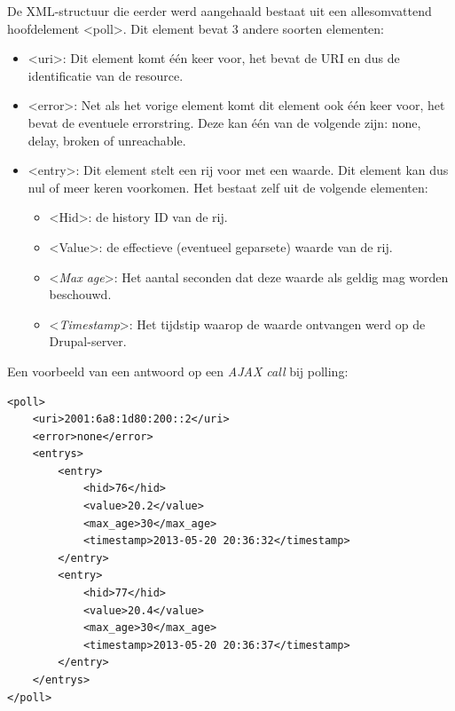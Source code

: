De XML-structuur die eerder werd aangehaald bestaat uit een allesomvattend hoofdelement \textless poll\textgreater. Dit element bevat 3 andere soorten elementen:
\begin{itemize}
\item \textless uri\textgreater: Dit element komt \'{e}\'{e}n keer voor, het bevat de URI en dus de identificatie van de resource.
\item \textless error\textgreater: Net als het vorige element komt dit element ook \'{e}\'{e}n keer voor, het bevat de eventuele errorstring. Deze kan \'{e}\'{e}n van de volgende zijn: none, delay, broken of unreachable.
\item \textless entry\textgreater: Dit element stelt een rij voor met een waarde. Dit element kan dus nul of meer keren voorkomen. Het bestaat zelf uit de volgende elementen:
\begin{itemize}
\item \textless Hid\textgreater: de history ID van de rij.
\item \textless Value\textgreater: de effectieve (eventueel geparsete) waarde van de rij.
\item \textless \textit{Max age}\textgreater: Het aantal seconden dat deze waarde als geldig mag worden beschouwd.
\item \textless \textit{Timestamp}\textgreater: Het tijdstip waarop de waarde ontvangen werd op de Drupal-server.
\end{itemize}
\end{itemize}

Een voorbeeld van een antwoord op een \textit{AJAX call} bij polling:

\lstset{language=XML}

\begin{lstlisting}[label=xmlPolling,caption=Voorbeeld antwoord op \textit{AJAX call} bij polling]
<poll>
	<uri>2001:6a8:1d80:200::2</uri>
	<error>none</error>
	<entrys>
		<entry>
			<hid>76</hid>
			<value>20.2</value>
			<max_age>30</max_age>
			<timestamp>2013-05-20 20:36:32</timestamp>
		</entry>
		<entry>
			<hid>77</hid>
			<value>20.4</value>
			<max_age>30</max_age>
			<timestamp>2013-05-20 20:36:37</timestamp>
		</entry>
	</entrys>
</poll>
\end{lstlisting}

